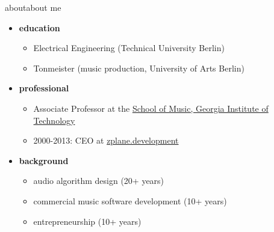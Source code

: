 \begin{frame}{about}{about me}
    \begin{itemize}
        \item   \textbf{education}
            \begin{itemize}
                \item   Electrical Engineering (Technical University Berlin)
                \item   Tonmeister (music production, University of Arts Berlin)
            \end{itemize}
        \bigskip
        \item   \textbf{professional}
            \begin{itemize}
                \item   Associate Professor at the \href{https://music.gatech.edu}{School of Music, Georgia Institute of Technology}
                \item   2000-2013: CEO at \href{https://www.zplane.de}{zplane.development}
            \end{itemize}
        \bigskip
        \item   \textbf{background}
            \begin{itemize}
                \item   audio algorithm design (20+ years)
                \item   commercial music software development (10+ years)
                \item   entrepreneurship (10+ years)
            \end{itemize}
    \end{itemize}
    
\end{frame}
